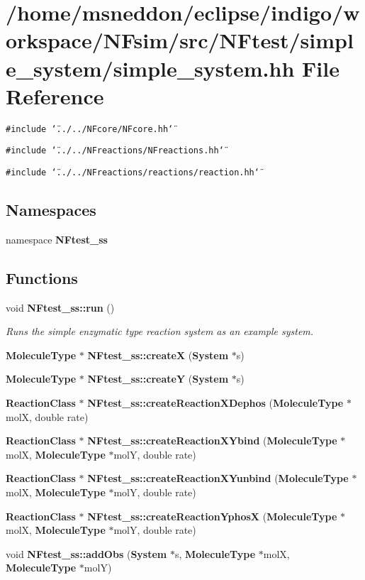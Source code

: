 \section{/home/msneddon/eclipse/indigo/workspace/NFsim/src/NFtest/simple\_\-system/simple\_\-system.hh File Reference}
\label{simple__system_8hh}


{\tt \#include \char`\"{}../../NFcore/NFcore.hh\char`\"{}}\par
{\tt \#include \char`\"{}../../NFreactions/NFreactions.hh\char`\"{}}\par
{\tt \#include \char`\"{}../../NFreactions/reactions/reaction.hh\char`\"{}}\par
\subsection*{Namespaces}
\begin{CompactItemize}
\item 
namespace {\bf NFtest\_\-ss}
\end{CompactItemize}
\subsection*{Functions}
\begin{CompactItemize}
\item 
void {\bf NFtest\_\-ss::run} ()
\begin{CompactList}\small\item\em Runs the simple enzymatic type reaction system as an example system. \item\end{CompactList}\item 
{\bf MoleculeType} $\ast$ {\bf NFtest\_\-ss::createX} ({\bf System} $\ast$s)
\item 
{\bf MoleculeType} $\ast$ {\bf NFtest\_\-ss::createY} ({\bf System} $\ast$s)
\item 
{\bf ReactionClass} $\ast$ {\bf NFtest\_\-ss::createReactionXDephos} ({\bf MoleculeType} $\ast$molX, double rate)
\item 
{\bf ReactionClass} $\ast$ {\bf NFtest\_\-ss::createReactionXYbind} ({\bf MoleculeType} $\ast$molX, {\bf MoleculeType} $\ast$molY, double rate)
\item 
{\bf ReactionClass} $\ast$ {\bf NFtest\_\-ss::createReactionXYunbind} ({\bf MoleculeType} $\ast$molX, {\bf MoleculeType} $\ast$molY, double rate)
\item 
{\bf ReactionClass} $\ast$ {\bf NFtest\_\-ss::createReactionYphosX} ({\bf MoleculeType} $\ast$molX, {\bf MoleculeType} $\ast$molY, double rate)
\item 
void {\bf NFtest\_\-ss::addObs} ({\bf System} $\ast$s, {\bf MoleculeType} $\ast$molX, {\bf MoleculeType} $\ast$molY)
\end{CompactItemize}
